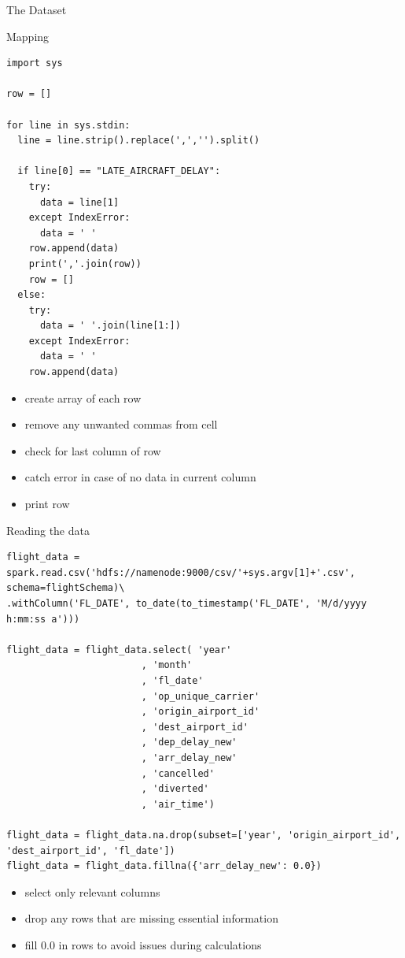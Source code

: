 \documentclass[10pt]{beamer}
\begin{document}
\begin{frame}{The Dataset}
\tiny{}

\end{frame}


\begin{frame}[fragile]{Mapping}
\begin{multicols}{2}
\begin{lstlisting}
import sys

row = []

for line in sys.stdin:
  line = line.strip().replace(',','').split()

  if line[0] == "LATE_AIRCRAFT_DELAY":
    try:
      data = line[1]
    except IndexError:
      data = ' '
    row.append(data)
    print(','.join(row))
    row = []
  else:
    try:
      data = ' '.join(line[1:])
    except IndexError:
      data = ' '
    row.append(data)
\end{lstlisting}
\columnbreak
\begin{itemize}
    \item create array of each row
    \item remove any unwanted commas from cell
    \item check for last column of row
    \item catch error in case of no data in current column
    \item print row
\end{itemize}
\end{multicols}
\end{frame}


\begin{frame}[fragile]{Reading the data}
\begin{multicols}{2}
\begin{lstlisting}
flight_data = spark.read.csv('hdfs://namenode:9000/csv/'+sys.argv[1]+'.csv', schema=flightSchema)\
.withColumn('FL_DATE', to_date(to_timestamp('FL_DATE', 'M/d/yyyy h:mm:ss a')))

flight_data = flight_data.select( 'year'
                        , 'month'
                        , 'fl_date'
                        , 'op_unique_carrier'
                        , 'origin_airport_id'
                        , 'dest_airport_id'
                        , 'dep_delay_new'
                        , 'arr_delay_new'
                        , 'cancelled'
                        , 'diverted'
                        , 'air_time')

flight_data = flight_data.na.drop(subset=['year', 'origin_airport_id', 'dest_airport_id', 'fl_date'])
flight_data = flight_data.fillna({'arr_delay_new': 0.0})
\end{lstlisting}
\columnbreak
\begin{itemize}
    \item select only relevant columns
    \item drop any rows that are missing essential information
    \item fill 0.0 in rows to avoid issues during calculations
\end{itemize}
\end{multicols}
\end{frame}
\end{document}
